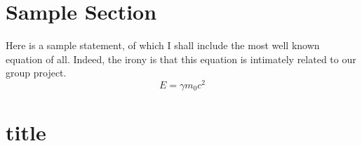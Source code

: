\documentclass[a4paper]{report}
\begin{document}
\tableofcontents

\section{Sample Section}
Here is a sample statement, of which I shall 
include the most well known equation of all. 
Indeed, the irony is that this equation is 
intimately related to our group project. 
\[ 
E = \gamma m_0 c^2
\]
\section{title}
\end{document}
